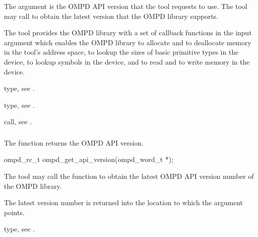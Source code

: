 \argdesc
The  argument is the OMPD API version that the tool requests
to use. The tool may call  to obtain the latest 
version that the OMPD library supports.

The tool provides the OMPD library with a set of callback functions in the 
 input argument which enables the OMPD library to allocate and 
to deallocate memory in the tool's address space, to lookup the sizes of basic 
primitive types in the device, to lookup symbols in the device, and to read and
to write memory in the device.

\begin{crossrefs}
\item {} type, see .

\item {} type, see .

\item {} call, 
see .
\end{crossrefs}



\subsubsection{}
\label{subsubsubsec:ompd_get_api_version}

\summary
The  function returns the OMPD API version.

\format
\begin{cspecific}
\begin{ompSyntax}
ompd_rc_t ompd_get_api_version(ompd_word_t *);
\end{ompSyntax}
\end{cspecific}

\descr
The tool may call the  function to obtain the 
latest OMPD API version number of the OMPD library.

\argdesc
The latest version number is returned into the location to which the 
 argument points.

\begin{crossrefs}
\item {} type, see .
\end{crossrefs}



